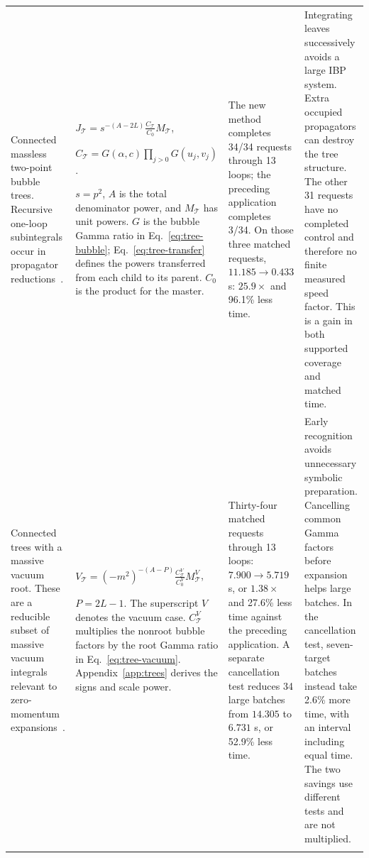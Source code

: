 \begin{landscape}
\begin{longtable}{@{}>{\raggedright\arraybackslash}p{3.9cm}>{\raggedright\arraybackslash}p{8.0cm}>{\raggedright\arraybackslash}p{5.1cm}>{\raggedright\arraybackslash}p{6.2cm}@{}}
Connected massless two-point bubble trees. Recursive one-loop subintegrals occur in propagator reductions~\cite{Ruijl2017Forcer}.
& $\displaystyle J_{\mathcal T}=s^{-(A-2L)}\frac{C_{\mathcal T}}{C_0}M_{\mathcal T}$,
\par $\displaystyle C_{\mathcal T}=G(\alpha,c)\prod_{j>0}G(u_j,v_j)$.
\par $s=p^2$, $A$ is the total denominator power, and $M_{\mathcal T}$ has unit powers. $G$ is the bubble Gamma ratio in Eq.~\eqref{eq:tree-bubble}; Eq.~\eqref{eq:tree-transfer} defines the powers transferred from each child to its parent. $C_0$ is the product for the master.
& The new method completes 34/34 requests through 13 loops; the preceding application completes 3/34. On those three matched requests, $11.185\to0.433$ s: $25.9\times$ and 96.1\% less time.
& Integrating leaves successively avoids a large IBP system. Extra occupied propagators can destroy the tree structure. The other 31 requests have no completed control and therefore no finite measured speed factor. This is a gain in both supported coverage and matched time.\\\addlinespace[7pt]

Connected trees with a massive vacuum root. These are a reducible subset of massive vacuum integrals relevant to zero-momentum expansions~\cite{SchroderSteinhauser2006}.
& $\displaystyle V_{\mathcal T}=(-m^2)^{-(A-P)}\frac{C_{\mathcal T}^{V}}{C_0^{V}}M_{\mathcal T}^{V}$,
\par $P=2L-1$. The superscript $V$ denotes the vacuum case. $C_{\mathcal T}^{V}$ multiplies the nonroot bubble factors by the root Gamma ratio in Eq.~\eqref{eq:tree-vacuum}. Appendix~\ref{app:trees} derives the signs and scale power.
& Thirty-four matched requests through 13 loops: $7.900\to5.719$ s, or $1.38\times$ and 27.6\% less time against the preceding application. A separate cancellation test reduces 34 large batches from $14.305$ to $6.731$ s, or 52.9\% less time.
& Early recognition avoids unnecessary symbolic preparation. Cancelling common Gamma factors before expansion helps large batches. In the cancellation test, seven-target batches instead take 2.6\% more time, with an interval including equal time. The two savings use different tests and are not multiplied.\\\addlinespace[7pt]


\end{longtable}
\end{landscape}
